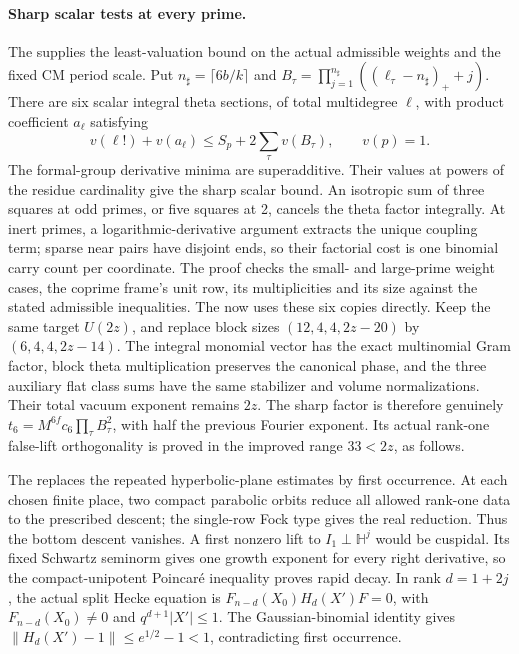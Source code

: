 \paragraph{Sharp scalar tests at every prime.}
The  supplies the least-valuation bound on the actual admissible
weights and the fixed CM period scale. Put
\(n_\sharp=\lceil6b/k\rceil\) and
\(B_\tau=\prod_{j=1}^{n_\sharp}((\ell_\tau-n_\sharp)_++j)\).
There are six scalar integral theta sections, of total multidegree
\(\ell\), with product coefficient \(a_\ell\) satisfying
\[
 v(\ell!)+v(a_\ell)\le S_p+2\sum_\tau v(B_\tau),\qquad v(p)=1.
\]
The formal-group derivative minima are superadditive. Their values
at powers of the residue cardinality give the sharp scalar bound.
An isotropic sum of three squares at odd primes, or five squares
at 2, cancels the theta factor integrally. At inert primes, a
logarithmic-derivative argument extracts the unique coupling term;
sparse near pairs have disjoint ends, so their factorial cost is
one binomial carry count per coordinate. The proof checks the
small- and large-prime weight cases, the coprime frame's unit row,
its multiplicities and its size against the stated admissible
inequalities.
The  now uses these six copies directly. Keep
the same target \(U(2z)\), and replace block sizes
\((12,4,4,2z-20)\) by \((6,4,4,2z-14)\).
The integral monomial vector has the exact multinomial Gram factor,
block theta multiplication preserves the canonical phase, and the
three auxiliary flat class sums have the same stabilizer and volume
normalizations. Their total vacuum exponent remains \(2z\).
The sharp factor is therefore genuinely
\(t_6=M^{6f}c_6\prod_\tau B_\tau^2\), with half the previous
Fourier exponent. Its actual rank-one false-lift orthogonality is
proved in the improved range \(33<2z\), as follows.

The  replaces the repeated hyperbolic-plane estimates by
first occurrence. At each chosen finite place, two compact parabolic
orbits reduce all allowed rank-one data to the prescribed descent;
the single-row Fock type gives the real reduction. Thus the bottom
descent vanishes. A first nonzero lift to \(I_1\perp\mathbb H^j\)
would be cuspidal. Its fixed Schwartz seminorm gives one growth
exponent for every right derivative, so the compact-unipotent
Poincar\'e inequality proves rapid decay. In rank \(d=1+2j\),
the actual split Hecke equation is \(F_{n-d}(X_0)H_d(X')F=0\),
with \(F_{n-d}(X_0)\ne0\) and \(q^{d+1}|X'|\le1\).
The Gaussian-binomial identity gives
\(\|H_d(X')-1\|\le e^{1/2}-1<1\), contradicting first occurrence.

